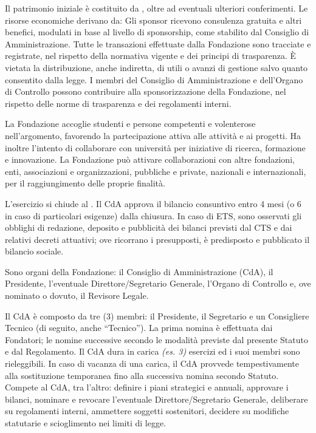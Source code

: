  Il patrimonio iniziale è costituito da , oltre ad eventuali ulteriori conferimenti.
 Le risorse economiche derivano da: \FontiFinanziamento
{} Gli sponsor ricevono consulenza gratuita e altri benefici, modulati in base al livello di sponsorship, come stabilito dal Consiglio di Amministrazione.
 Tutte le transazioni effettuate dalla Fondazione sono tracciate e registrate, nel rispetto della normativa vigente e dei principi di trasparenza.
È vietata la distribuzione, anche indiretta, di utili o avanzi di gestione salvo quanto consentito dalla legge.
 I membri del Consiglio di Amministrazione e dell'Organo di Controllo possono contribuire alla sponsorizzazione della Fondazione, nel rispetto delle norme di trasparenza e dei regolamenti interni.

 La Fondazione accoglie studenti e persone competenti e volenterose nell’argomento, favorendo la partecipazione attiva alle attività e ai progetti. Ha inoltre l’intento di collaborare con università per iniziative di ricerca, formazione e innovazione.
 La Fondazione può attivare collaborazioni con altre fondazioni, enti, associazioni e organizzazioni, pubbliche e private, nazionali e internazionali, per il raggiungimento delle proprie finalità.

 L'esercizio si chiude al . Il CdA approva il bilancio consuntivo entro 4 mesi (o 6 in caso di particolari esigenze) dalla chiusura.
\ifETS
{} In caso di ETS, sono osservati gli obblighi di redazione, deposito e pubblicità dei bilanci previsti dal CTS e dai relativi decreti attuativi; ove ricorrano i presupposti, è predisposto e pubblicato il bilancio sociale.
\fi

 Sono organi della Fondazione: il Consiglio di Amministrazione (CdA), il Presidente, l'eventuale Direttore/Segretario Generale, l'Organo di Controllo e, ove nominato o dovuto, il Revisore Legale.

 Il CdA è composto da tre (3) membri: il Presidente, il Segretario e un Consigliere Tecnico (di seguito, anche ``Tecnico''). La prima nomina è effettuata dai Fondatori; le nomine successive secondo le modalità previste dal presente Statuto e dal Regolamento.
 Il CdA dura in carica \textit{(es. 3)} esercizi ed i suoi membri sono rieleggibili. In caso di vacanza di una carica, il CdA provvede tempestivamente alla sostituzione temporanea fino alla successiva nomina secondo Statuto.
 Compete al CdA, tra l'altro: definire i piani strategici e annuali, approvare i bilanci, nominare e revocare l'eventuale Direttore/Segretario Generale, deliberare su regolamenti interni, ammettere soggetti sostenitori, decidere su modifiche statutarie e scioglimento nei limiti di legge.

